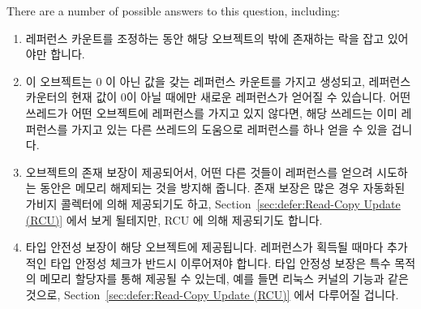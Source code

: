 There are a number of possible answers to this question, including:
\fi

\begin{enumerate}
\item	레퍼런스 카운트를 조정하는 동안 해당 오브젝트의 밖에 존재하는 락을 잡고
	있어야만 합니다.
\item	이 오브젝트는 0 이 아닌 값을 갖는 레퍼런스 카운트를 가지고 생성되고,
	레퍼런스 카운터의 현재 값이 0이 아닐 때에만 새로운 레퍼런스가 얻어질 수
	있습니다.
	어떤 쓰레드가 어떤 오브젝트에 레퍼런스를 가지고 있지 않다면, 해당
	쓰레드는 이미 레퍼런스를 가지고 있는 다른 쓰레드의 도움으로 레퍼런스를
	하나 얻을 수 있을 겁니다.
\item	오브젝트의 존재 보장이 제공되어서, 어떤 다른 것들이 레퍼런스를 얻으려
	시도하는 동안은 메모리 해제되는 것을 방지해 줍니다.
	존재 보장은 많은 경우 자동화된 가비지 콜렉터에 의해 제공되기도 하고,
	Section~\ref{sec:defer:Read-Copy Update (RCU)} 에서 보게 될테지만, RCU
	에 의해 제공되기도 합니다.
\item	타입 안전성 보장이 해당 오브젝트에 제공됩니다.
	레퍼런스가 획득될 때마다 추가적인 타입 안정성 체크가 반드시 이루어져야
	합니다.
	타입 안정성 보장은 특수 목적의 메모리 할당자를 통해 제공될 수 있는데,
	예를 들면 리눅스 커널의  기능과 같은 것으로,
	Section~\ref{sec:defer:Read-Copy Update (RCU)} 에서 다루어질 겁니다.

\end{enumerate}

